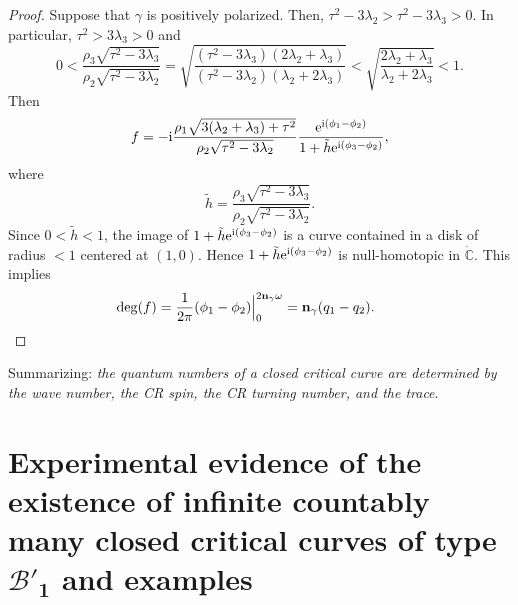 \documentclass[10pt,a4paper]{amsart}
\numberwithin{equation}{section}
\def\C{\mathbb{C}}
\begin{document}
\begin{proof}
Suppose that $\gamma$ is
positively
polarized. Then, $\tau^2-3\lambda_2>\tau^2-3\lambda_3>0$. In particular, $\tau^2>3\lambda_3>0$ and
\[
0<\frac{\rho_3\sqrt{\tau^2-3\lambda_3}}{\rho_2\sqrt{\tau^2-3\lambda_2}}
=\sqrt{\frac{(\tau^2-3\lambda_3)(2\lambda_2+\lambda_3)}{(\tau^2-3\lambda_2)(\lambda_2+2\lambda_3)}}
< \sqrt{
\frac{2\lambda_2+\lambda_3}
{\lambda_2+2\lambda_3}}<1.
\]
Then
\[
 f= -{\rm i}\frac{\rho_1\sqrt{3(\lambda_2 + \lambda_3)+\tau^2}}{\rho_2\sqrt{\tau^2-3\lambda_2}}\frac{{\rm e}^{{\rm i}(\phi_1-\phi_2)}}{1+\tilde{h} {\rm e}^{{\rm i}(\phi_3-\phi_2)}},
\]
where
\[
 \tilde{h} =\frac{\rho_3\sqrt{\tau^2-3\lambda_3}}{\rho_2\sqrt{\tau^2-3\lambda_2}}.
\]
Since $0<\tilde{h}<1$, the image of $1+\tilde{h}{\rm e}^{{\rm i}(\phi_3-\phi_2)}$
is a curve contained in a disk of radius $<1$ centered at $(1,0)$.
Hence $1+\tilde{h}{\rm e}^{{\rm i}(\phi_3-\phi_2)}$
is null-homotopic in $\dot{\C}$.
This implies
\[
 \deg (f)=\frac{1}{2\pi} (\phi_1-\phi_2)\Big|_0^{2{\bf n}_{\gamma}\omega} = {\bf n}_{\gamma}(q_1-q_2).\tag*{\qed}
\]\renewcommand{\qed}{}
\end{proof}

Summarizing: \emph{the quantum numbers of a closed critical curve are determined by the wave number,
the CR spin, the CR turning number, and the trace}.

\section[Experimental evidence of the existence of infinite countably many closed
 critical curves of type B'\_1 and examples]{Experimental evidence of the existence of infinite countably\\ many closed
 critical curves of type $\boldsymbol{{\mathcal B}'_1}$ and examples}\label{s:heuristic}
\end{document}
